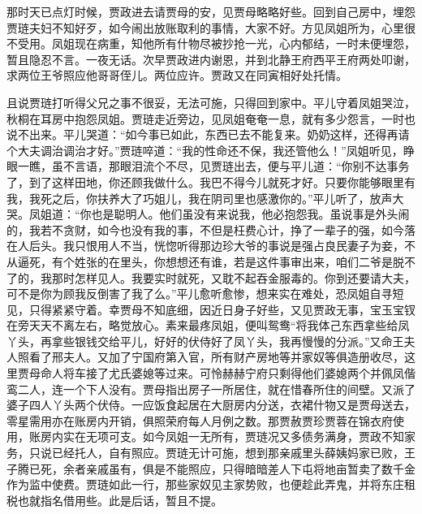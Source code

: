 \begin{parag}
    那时天已点灯时候，贾政进去请贾母的安，见贾母略略好些。回到自己房中，埋怨贾琏夫妇不知好歹，如今闹出放账取利的事情，大家不好。方见凤姐所为，心里很不受用。凤姐现在病重，知他所有什物尽被抄抢一光，心内郁结，一时未便埋怨，暂且隐忍不言。一夜无话。次早贾政进内谢恩，并到北静王府西平王府两处叩谢，求两位王爷照应他哥哥侄儿。两位应许。贾政又在同寅相好处托情。
\end{parag}


\begin{parag}
    且说贾琏打听得父兄之事不很妥，无法可施，只得回到家中。平儿守着凤姐哭泣，秋桐在耳房中抱怨凤姐。贾琏走近旁边，见凤姐奄奄一息，就有多少怨言，一时也说不出来。平儿哭道：“如今事已如此，东西已去不能复来。奶奶这样，还得再请个大夫调治调治才好。”贾琏啐道：“我的性命还不保，我还管他么！”凤姐听见，睁眼一瞧，虽不言语，那眼泪流个不尽，见贾琏出去，便与平儿道：“你别不达事务了，到了这样田地，你还顾我做什么。我巴不得今儿就死才好。只要你能够眼里有我，我死之后，你扶养大了巧姐儿，我在阴司里也感激你的。”平儿听了，放声大哭。凤姐道：“你也是聪明人。他们虽没有来说我，他必抱怨我。虽说事是外头闹的，我若不贪财，如今也没有我的事，不但是枉费心计，挣了一辈子的强，如今落在人后头。我只恨用人不当，恍惚听得那边珍大爷的事说是强占良民妻子为妾，不从逼死，有个姓张的在里头，你想想还有谁，若是这件事审出来，咱们二爷是脱不了的，我那时怎样见人。我要实时就死，又耽不起吞金服毒的。你到还要请大夫，可不是你为顾我反倒害了我了么。”平儿愈听愈惨，想来实在难处，恐凤姐自寻短见，只得紧紧守着。幸贾母不知底细，因近日身子好些，又见贾政无事，宝玉宝钗在旁天天不离左右，略觉放心。素来最疼凤姐，便叫鸳鸯“将我体己东西拿些给凤丫头，再拿些银钱交给平儿，好好的伏侍好了凤丫头，我再慢慢的分派。”又命王夫人照看了邢夫人。又加了宁国府第入官，所有财产房地等并家奴等俱造册收尽，这里贾母命人将车接了尤氏婆媳等过来。可怜赫赫宁府只剩得他们婆媳两个并佩凤偕鸾二人，连一个下人没有。贾母指出房子一所居住，就在惜春所住的间壁。又派了婆子四人丫头两个伏侍。一应饭食起居在大厨房内分送，衣裙什物又是贾母送去，零星需用亦在账房内开销，俱照荣府每人月例之数。那贾赦贾珍贾蓉在锦衣府使用，账房内实在无项可支。如今凤姐一无所有，贾琏况又多债务满身，贾政不知家务，只说已经托人，自有照应。贾琏无计可施，想到那亲戚里头薛姨妈家已败，王子腾已死，余者亲戚虽有，俱是不能照应，只得暗暗差人下屯将地亩暂卖了数千金作为监中使费。贾琏如此一行，那些家奴见主家势败，也便趁此弄鬼，并将东庄租税也就指名借用些。此是后话，暂且不提。
\end{parag}


